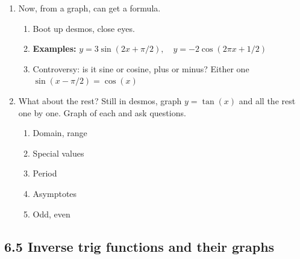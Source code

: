 \documentclass{article}
\begin{document}
\begin{enumerate}
\item Now, from a graph, can get a formula. 
\begin{enumerate}
\item Boot up desmos, close eyes.
\item {\bf Examples: } $y=3\sin(2x+\pi/2), \quad y=-2\cos(2\pi x+1/2)$
\item Controversy: is it sine or cosine, plus or minus? Either one $\sin(x-\pi/2) = \cos(x)$
\end{enumerate}

\item What about the rest? Still in desmos, graph $y = \tan(x)$ and all the rest one by one. Graph of each and ask questions.
\begin{enumerate}
\item Domain, range
\item Special values
\item Period
\item Asymptotes
\item Odd, even
\end{enumerate}
\end{enumerate}

\subsection{6.5 Inverse trig functions and their graphs}
\end{document}
